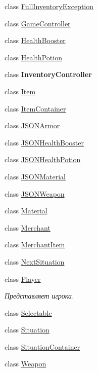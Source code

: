 \begin{DoxyCompactItemize}
class \hyperlink{class_a_s_c_i_i_wars_1_1_game_1_1_full_inventory_exception}{Full\+Inventory\+Exception}
\item 
class \hyperlink{class_a_s_c_i_i_wars_1_1_game_1_1_game_controller}{Game\+Controller}
\item 
class \hyperlink{class_a_s_c_i_i_wars_1_1_game_1_1_health_booster}{Health\+Booster}
\item 
class \hyperlink{class_a_s_c_i_i_wars_1_1_game_1_1_health_potion}{Health\+Potion}
\item 
class {\bfseries Inventory\+Controller}
\item 
class \hyperlink{class_a_s_c_i_i_wars_1_1_game_1_1_item}{Item}
\item 
class \hyperlink{class_a_s_c_i_i_wars_1_1_game_1_1_item_container}{Item\+Container}
\item 
class \hyperlink{class_a_s_c_i_i_wars_1_1_game_1_1_j_s_o_n_armor}{J\+S\+O\+N\+Armor}
\item 
class \hyperlink{class_a_s_c_i_i_wars_1_1_game_1_1_j_s_o_n_health_booster}{J\+S\+O\+N\+Health\+Booster}
\item 
class \hyperlink{class_a_s_c_i_i_wars_1_1_game_1_1_j_s_o_n_health_potion}{J\+S\+O\+N\+Health\+Potion}
\item 
class \hyperlink{class_a_s_c_i_i_wars_1_1_game_1_1_j_s_o_n_material}{J\+S\+O\+N\+Material}
\item 
class \hyperlink{class_a_s_c_i_i_wars_1_1_game_1_1_j_s_o_n_weapon}{J\+S\+O\+N\+Weapon}
\item 
class \hyperlink{class_a_s_c_i_i_wars_1_1_game_1_1_material}{Material}
\item 
class \hyperlink{class_a_s_c_i_i_wars_1_1_game_1_1_merchant}{Merchant}
\item 
class \hyperlink{class_a_s_c_i_i_wars_1_1_game_1_1_merchant_item}{Merchant\+Item}
\item 
class \hyperlink{class_a_s_c_i_i_wars_1_1_game_1_1_next_situation}{Next\+Situation}
\item 
class \hyperlink{class_a_s_c_i_i_wars_1_1_game_1_1_player}{Player}
\begin{DoxyCompactList}\small\item\em Представляет игрока. \end{DoxyCompactList}\item 
class \hyperlink{class_a_s_c_i_i_wars_1_1_game_1_1_selectable}{Selectable}
\item 
class \hyperlink{class_a_s_c_i_i_wars_1_1_game_1_1_situation}{Situation}
\item 
class \hyperlink{class_a_s_c_i_i_wars_1_1_game_1_1_situation_container}{Situation\+Container}
\item 
class \hyperlink{class_a_s_c_i_i_wars_1_1_game_1_1_weapon}{Weapon}
\end{DoxyCompactItemize}
